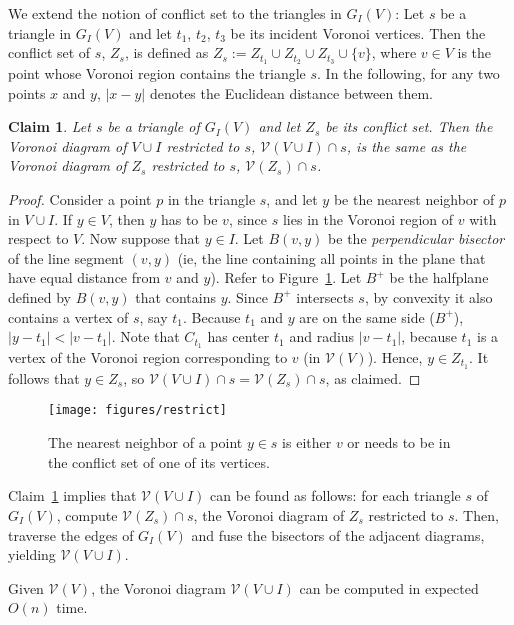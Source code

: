 \documentclass{siamltex}
\newcommand{\cV}{\mathcal{V}}
\newcommand{\eqdef}{:=}
\newtheorem{claim}[theorem]{Claim}
\begin{document}
We extend the notion of conflict set to the triangles
in $G_I(V)$: Let $s$ be a triangle in $G_I(V)$ and let $t_1$, $t_2$, $t_3$ be
its incident Voronoi vertices. Then the conflict set of $s$, $Z_s$, 
is defined as 
$Z_s \eqdef Z_{t_1} \cup Z_{t_2} \cup Z_{t_3} \cup \{v\}$, 
where $v \in V$ is the
point whose Voronoi region contains the triangle $s$.
In the following, for any two points $x$ and $y$,
$|x-y|$ denotes the Euclidean distance between them.
\medskip
\begin{claim}\label{clm:VDVX}
Let $s$ be a triangle of $G_I(V)$ and let $Z_s$ be its conflict set. Then the
Voronoi diagram of $V \cup I$ restricted to $s$, 
$\cV(V \cup I) \cap s$,
is the same as the Voronoi diagram of $Z_s$ restricted to $s$, 
$\cV(Z_s) \cap s$.
\end{claim}

\begin{proof}
Consider a point $p$ in the triangle $s$, and let $y$ be
the nearest neighbor of $p$ in $V \cup I$. If $y \in V$, then
$y$ has to be $v$, since $s$ lies in the Voronoi region of $v$
with respect to $V$. Now suppose that $y \in I$. 
Let $B(v,y)$ be the \emph{perpendicular bisector} of the line 
segment $(v,y)$ (ie, the line
containing all points in the plane that have equal distance from
$v$ and $y$). Refer to Figure~\ref{fig:nbr}. Let $B^+$ be the halfplane 
defined by $B(v,y)$ that contains $y$. Since $B^+$ intersects $s$, by 
convexity it also contains a vertex of $s$, say $t_1$. Because $t_1$ 
and $y$ are on the same side ($B^+$),
$|y - t_1| < |v - t_1|$.
Note that $C_{t_1}$ has center $t_1$ and radius $|v-t_1|$, because
$t_1$ is a vertex of the Voronoi region corresponding
to $v$ (in $\cV(V)$).
Hence, $y \in Z_{t_1}$.
It follows that $y \in Z_s$, so 
$\cV(V \cup I) \cap s =  \cV(Z_s) \cap s$, as claimed.
\end{proof}
\medskip
\begin{figure}
\begin{center}
\texttt{[image: figures/restrict]}
\end{center}
\caption{The nearest neighbor of a point $y \in s$ is either
$v$ or needs to be in the conflict set of one of its vertices.} \label{fig:nbr}
\end{figure}

Claim~\ref{clm:VDVX} implies that $\cV(V \cup I)$ can be found
as follows: for each triangle $s$ of $G_I(V)$, compute 
$\cV(Z_s) \cap s$, the Voronoi diagram of $Z_s$ restricted to $s$. 
Then, traverse the edges of $G_I(V)$ and fuse the bisectors of the
adjacent diagrams, yielding $\cV(V \cup I)$.
\begin{lemma}
Given $\cV(V)$, the Voronoi diagram $\cV(V \cup I)$ can be 
computed in expected $O(n)$ time.
\end{lemma}
\end{document}

